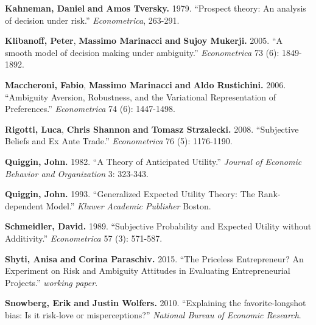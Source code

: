 \documentclass[pdftex]{article}
\numberwithin{equation}{section}
\theoremstyle{th}
\newtheorem{proof lemma}{{Proof Lemma}.}
\theoremstyle{definition}
\newtheorem*{risk lovers}{Risk lovers}
\newtheorem*{risk averse}{Risk averse}
\begin{document}
{\begin{thebibliography}{}
\textbf{Kahneman, Daniel} \textbf{and} \textbf{Amos Tversky.} 1979. ``{Prospect theory: An analysis of decision under risk.}'' \emph{Econometrica}, 263-291.


\textbf{Klibanoff, Peter}, \textbf{Massimo Marinacci} \textbf{and} \textbf{Sujoy Mukerji.} 2005. ``{A smooth model of decision making under ambiguity.}'' \emph{Econometrica} 73 ({6}): 1849-1892.

\textbf{Maccheroni, Fabio}, \textbf{Massimo Marinacci} \textbf{and} \textbf{Aldo Rustichini.} 2006. ``{Ambiguity Aversion, Robustness, and the Variational Representation of Preferences.}'' \emph{Econometrica} 74 ({6}): 1447-1498.

\textbf{Rigotti, Luca}, \textbf{Chris Shannon} \textbf{and} \textbf{Tomasz Strzalecki.} 2008. ``{Subjective Beliefs and Ex Ante Trade.}'' \emph{Econometrica} 76 ({5}): 1176-1190.

\textbf{Quiggin, John.} 1982. ``{A Theory of Anticipated Utility.}'' \emph{Journal of Economic Behavior and Organization} 3: 323-343. 

\textbf{Quiggin, John.} 1993. ``{Generalized Expected Utility Theory: The Rank-dependent Model.}'' \emph{Kluwer Academic Publisher} Boston. 

\textbf{Schmeidler, David.} 1989. ``{Subjective Probability and Expected Utility without Additivity.}'' \emph{Econometrica} 57 ({3}): 571-587. 

\textbf{Shyti, Anisa} \textbf{and} \textbf{Corina Paraschiv.} 2015. ``{The Priceless Entrepreneur?
An Experiment on Risk and Ambiguity Attitudes in
Evaluating Entrepreneurial Projects.}'' \emph{working paper}.



\textbf{Snowberg, Erik} \textbf{and} \textbf{Justin Wolfers.} 2010. ``{Explaining the favorite-longshot bias: Is it risk-love or misperceptions?}'' \emph{National Bureau of Economic Research}.



\end{thebibliography}}
\end{document}
